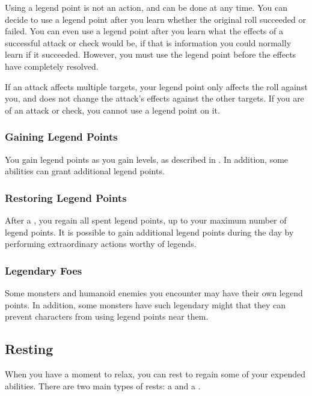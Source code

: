             Using a legend point is not an action, and can be done at any time.
            You can decide to use a legend point after you learn whether the original roll succeeded or failed.
            You can even use a legend point after you learn what the effects of a successful attack or check would be, if that is information you could normally learn if it succeeded.
            However, you must use the legend point before the effects have completely resolved.

            If an attack affects multiple targets, your legend point only affects the roll against you, and does not change the attack's effects against the other targets.
            If you are  of an attack or check, you cannot use a legend point on it.

        \subsubsection{Gaining Legend Points}

            You gain legend points as you gain levels, as described in .
            In addition, some abilities can grant additional legend points.

        \subsubsection{Restoring Legend Points}

            After a , you regain all spent legend points, up to your maximum number of legend points.
            It is possible to gain additional legend points during the day by performing extraordinary actions worthy of legends.

        \subsubsection{Legendary Foes}
            Some monsters and humanoid enemies you encounter may have their own legend points.
            In addition, some monsters have such legendary might that they can prevent characters from using legend points near them.

    \subsection{Resting}
        When you have a moment to relax, you can rest to regain some of your expended abilities.
        There are two main types of rests: a  and a .

